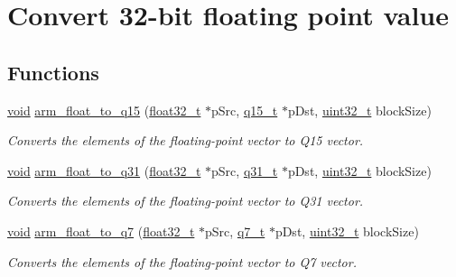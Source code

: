 \hypertarget{group__float__to__x}{\section{Convert 32-\/bit floating point value}
\label{group__float__to__x}
}
\subsection*{Functions}
\begin{DoxyCompactItemize}
\item 
\hyperlink{group___n_a_m_e_ga18028b8badbf1ea7e704ccac3c488e82}{void} \hyperlink{group__float__to__x_ga215456e35a18db86882e1d3f0d24e1f2}{arm\-\_\-float\-\_\-to\-\_\-q15} (\hyperlink{arm__math_8h_a4611b605e45ab401f02cab15c5e38715}{float32\-\_\-t} $\ast$p\-Src, \hyperlink{arm__math_8h_ab5a8fb21a5b3b983d5f54f31614052ea}{q15\-\_\-t} $\ast$p\-Dst, \hyperlink{stdint_8h_a435d1572bf3f880d55459d9805097f62}{uint32\-\_\-t} block\-Size)
\begin{DoxyCompactList}\small\item\em Converts the elements of the floating-\/point vector to Q15 vector. \end{DoxyCompactList}\item 
\hyperlink{group___n_a_m_e_ga18028b8badbf1ea7e704ccac3c488e82}{void} \hyperlink{group__float__to__x_ga177704107f94564e9abe4daaa36f4554}{arm\-\_\-float\-\_\-to\-\_\-q31} (\hyperlink{arm__math_8h_a4611b605e45ab401f02cab15c5e38715}{float32\-\_\-t} $\ast$p\-Src, \hyperlink{arm__math_8h_adc89a3547f5324b7b3b95adec3806bc0}{q31\-\_\-t} $\ast$p\-Dst, \hyperlink{stdint_8h_a435d1572bf3f880d55459d9805097f62}{uint32\-\_\-t} block\-Size)
\begin{DoxyCompactList}\small\item\em Converts the elements of the floating-\/point vector to Q31 vector. \end{DoxyCompactList}\item 
\hyperlink{group___n_a_m_e_ga18028b8badbf1ea7e704ccac3c488e82}{void} \hyperlink{group__float__to__x_ga44a393818cdee8dce80f2d66add25411}{arm\-\_\-float\-\_\-to\-\_\-q7} (\hyperlink{arm__math_8h_a4611b605e45ab401f02cab15c5e38715}{float32\-\_\-t} $\ast$p\-Src, \hyperlink{arm__math_8h_ae541b6f232c305361e9b416fc9eed263}{q7\-\_\-t} $\ast$p\-Dst, \hyperlink{stdint_8h_a435d1572bf3f880d55459d9805097f62}{uint32\-\_\-t} block\-Size)
\begin{DoxyCompactList}\small\item\em Converts the elements of the floating-\/point vector to Q7 vector. \end{DoxyCompactList}\end{DoxyCompactItemize}



